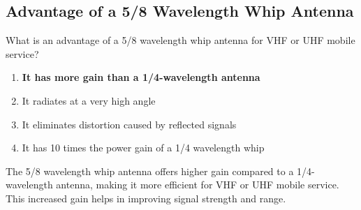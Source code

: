 \subsection{Advantage of a 5/8 Wavelength Whip Antenna}
\label{T9A12}

\begin{tcolorbox}[colback=gray!10!white,colframe=black!75!black,title=T9A12]
What is an advantage of a 5/8 wavelength whip antenna for VHF or UHF mobile service?
\begin{enumerate}[noitemsep]
    \item \textbf{It has more gain than a 1/4-wavelength antenna}
    \item It radiates at a very high angle
    \item It eliminates distortion caused by reflected signals
    \item It has 10 times the power gain of a 1/4 wavelength whip
\end{enumerate}
\end{tcolorbox}

The 5/8 wavelength whip antenna offers higher gain compared to a 1/4-wavelength antenna, making it more efficient for VHF or UHF mobile service. This increased gain helps in improving signal strength and range.